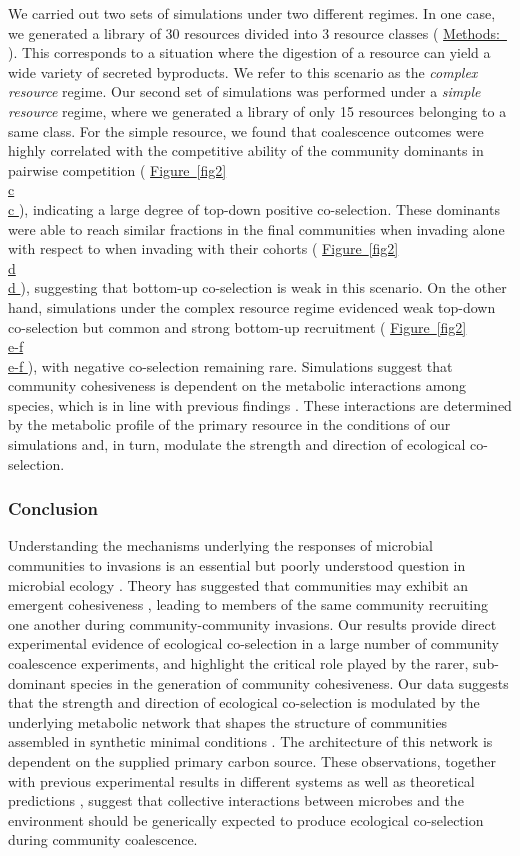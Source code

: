 \documentclass[a4paper,10pt]{article}
\newcommand{\figref}[2][]{%
  \hyperref[{#2}]{%
    Figure~\ref*{#2}%
    \ifx\\#1\\%
    \else
      #1%
    \fi
  }%
}
\newcommand{\methodsref}[1]{%
  \hyperref[{methods:#1}]{%
   Methods:~\nameref*{methods:#1}%
  }%
}
\begin{document}
We carried out two sets of simulations under two different regimes.
In one case, we generated a library of 30 resources divided into 3 resource classes
(\methodsref{sim}). This corresponds to a situation where the digestion of a resource
can yield a wide variety of secreted byproducts.
We refer to this scenario as the \textit{complex resource} regime.
Our second set of simulations was performed under a \textit{simple resource} regime, where we
generated a library of only 15 resources belonging to a same class.
For the simple resource, we found that coalescence outcomes were highly correlated with
the competitive ability of the community dominants in pairwise competition
(\figref[c]{fig2}),
indicating a large degree of top-down positive co-selection.
These dominants were able to reach similar fractions in the final communities when invading alone
with respect to when invading with their cohorts
(\figref[d]{fig2}),
suggesting that bottom-up co-selection is weak in this scenario.
On the other hand,
simulations under the complex resource regime evidenced weak top-down co-selection but 
common and strong bottom-up recruitment (\figref[e-f]{fig2}), with negative co-selection remaining rare.
Simulations suggest that community cohesiveness is dependent on the metabolic interactions among species,
which is in line with previous findings \cite{Goldford2018, Estrela2020}.
These interactions are determined by the metabolic profile of the primary resource in the conditions
of our simulations and, in turn, modulate the strength and direction of ecological co-selection.

\subsubsection*{Conclusion}

Understanding the mechanisms underlying the responses of microbial communities to invasions is
an essential but poorly understood question in microbial ecology \cite{Rillig2015}.
Theory has suggested that communities may exhibit an emergent cohesiveness
\cite{Gilpin1994,Livingston2013,Tikhonov2016,Tikhonov2017},
leading to members of the same community recruiting one another during
community-community invasions.
Our results provide direct experimental evidence of ecological co-selection in a large number
of community coalescence experiments,
and highlight the critical role played by the rarer, sub-dominant species in the generation
of community cohesiveness.
Our data suggests that the strength and direction of ecological co-selection is modulated
by the underlying metabolic network that shapes the structure of
communities assembled in synthetic minimal conditions
\cite{Goldford2018,Estrela2020}.
The architecture of this network is dependent on the supplied primary carbon source.
These observations,
together with previous experimental results in different systems \cite{Sierocinski2017} as well as
theoretical predictions
\cite{Gilpin1994,Toquenaga1997,Tikhonov2016,Tikhonov2017,Vila2019,Lechon2021},
suggest that collective interactions between microbes
and the environment should be generically expected to produce ecological co-selection
during community coalescence.
\end{document}
